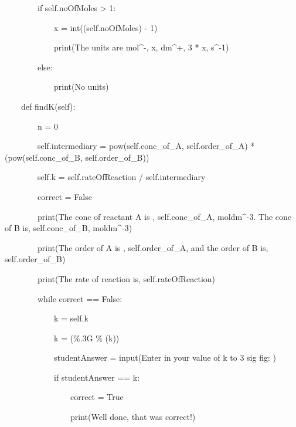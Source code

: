 \documentclass{article}
\begin{document}
\ \ \ \ \ \ \ \ if self.noOfMoles {\textgreater} 1:

\ \ \ \ \ \ \ \ \ \ \ \ x = int((self.noOfMoles) - 1)


\bigskip

\ \ \ \ \ \ \ \ \ \ \ \ print({\textquotedbl}The units are mol\^{}-{\textquotedbl}, x, {\textquotedbl}dm\^{}+{\textquotedbl}, 3 * x, {\textquotedbl}s\^{}-1{\textquotedbl})

\ \ \ \ \ \ \ \ else:

\ \ \ \ \ \ \ \ \ \ \ \ print({\textquotedbl}No units{\textquotedbl}) \ \ \ \ \ \ \ 


\bigskip


\bigskip


\bigskip

\ \ \ \ def findK(self):

\ \ \ \ \ \ \ \ n = 0

\ \ \ \ \ \ \ \ self.intermediary = pow(self.conc\_of\_A, self.order\_of\_A) * (pow(self.conc\_of\_B, self.order\_of\_B))

\ \ \ \ \ \ \ \ self.k = self.rateOfReaction / self.intermediary

\ \ \ \ \ \ \ \ correct = False

\ \ \ \ \ \ \ \ print({\textquotedbl}The conc of reactant A is {\textquotedbl}, self.conc\_of\_A, {\textquotedbl}moldm\^{}-3. The conc of B is{\textquotedbl}, self.conc\_of\_B, {\textquotedbl}moldm\^{}-3{\textquotedbl})

\ \ \ \ \ \ \ \ print({\textquotedbl}The order of A is {\textquotedbl}, self.order\_of\_A, {\textquotedbl}and the order of B is{\textquotedbl}, self.order\_of\_B)

\ \ \ \ \ \ \ \ print({\textquotedbl}The rate of reaction is{\textquotedbl}, self.rateOfReaction)

\ \ \ \ \ \ \ \ while correct == False:

\ \ \ \ \ \ \ \ \ \ \ \ k = self.k

\ \ \ \ \ \ \ \ \ \ \ \ k = ({\textquotedbl}\%.3G{\textquotedbl} \% (k))


\bigskip


\bigskip

\ \ \ \ \ \ \ \ \ \ \ \ studentAnswer = input({\textquotedbl}Enter in your value of k to 3 sig fig: {\textquotedbl})

\ \ \ \ \ \ \ \ \ \ \ \ if studentAnswer == k:

\ \ \ \ \ \ \ \ \ \ \ \ \ \ \ \ correct = True

\ \ \ \ \ \ \ \ \ \ \ \ \ \ \ \ print({\textquotedbl}Well done, that was correct!{\textquotedbl})
\end{document}
